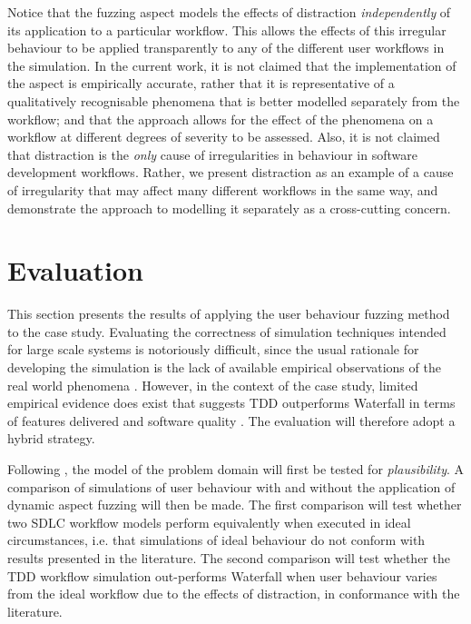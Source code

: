 \documentclass{llncs}
\begin{document}
Notice that the fuzzing aspect models the effects of distraction \emph{independently} of its application to a particular
workflow.  This allows the effects of this irregular behaviour to be applied transparently to any of the different
user workflows in the simulation. In the current work, it is not claimed that the implementation of the aspect is
empirically accurate, rather that it is representative of a qualitatively recognisable phenomena that is better modelled
separately from the workflow; and that the approach allows for the effect of the phenomena on a workflow at different
degrees of severity to be assessed.  Also, it is not claimed that distraction is the \emph{only} cause of irregularities in
behaviour in software development workflows.  Rather, we present distraction as an example of a cause of irregularity
that may affect many different workflows in the same way, and demonstrate the approach to modelling it separately as a
cross-cutting concern.
 

\section{Evaluation}
\label{sec:evaluation}


This section presents the results of applying the user behaviour fuzzing method to the case study.  Evaluating the
correctness of simulation techniques intended for large scale systems is notoriously difficult, since the usual
rationale for developing the simulation is the lack of available empirical observations of the real world phenomena
\cite{naylor67verification}.  However, in the context of the case study, limited empirical evidence does exist that
suggests TDD outperforms Waterfall in terms of features delivered and software quality
\citep{Bhat2006TestDrivenDevelopment,George2004TestDrivenDevelopment,Huang2009EmpiricalTestFirstProgramming}.  The
evaluation will therefore adopt a hybrid strategy.

Following \citet{naylor67verification}, the model of the problem domain will first be tested for \emph{plausibility}.  A
comparison of simulations of user behaviour with and without the application of dynamic aspect fuzzing will then be
made.  The first comparison will test whether two SDLC workflow models perform equivalently when executed in ideal
circumstances, i.e. that simulations of ideal behaviour do not conform with results presented in the literature. The
second comparison will test whether the TDD workflow simulation out-performs Waterfall when user behaviour varies from
the ideal workflow due to the effects of distraction, in conformance with the literature.
\end{document}
